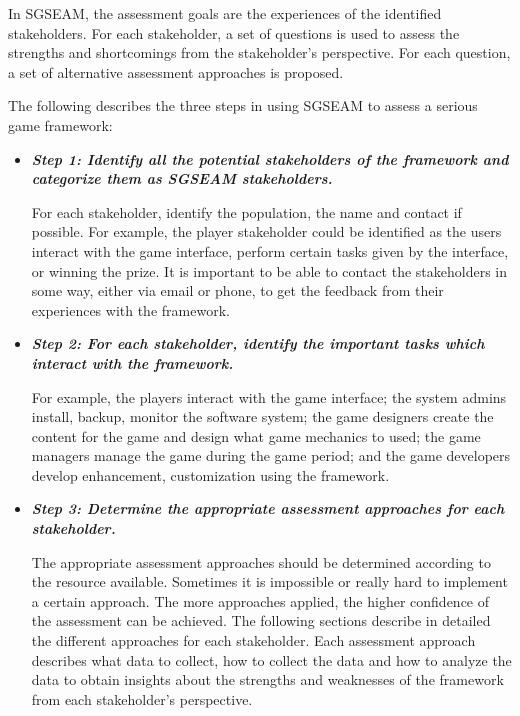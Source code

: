 In SGSEAM, the assessment goals are the experiences of the identified stakeholders. For each
stakeholder, a set of questions is used to assess the strengths and shortcomings from the
stakeholder's perspective. For each question, a set of alternative assessment approaches is
proposed.

The following describes the three steps in using SGSEAM to assess a serious game framework:

\begin{itemize}
\item \textbf{\emph{Step 1: Identify all the potential stakeholders of the framework and categorize them as SGSEAM stakeholders.}}

For each stakeholder, identify the population, the name and contact if possible. For example, the 
player stakeholder could be identified as the users interact with the game interface, perform certain tasks given by the interface, or winning the prize. It is important to be able to contact the stakeholders in some way, either via email or phone, to get the feedback from their experiences with the framework.


\item \textbf{\emph{Step 2: For each stakeholder, identify the important tasks which interact with the framework.}}
    
For example, the players interact with the game interface; the system admins install, backup, monitor the software system; the game designers create the content for the game and design what game mechanics to used; the game managers manage the game during the game period; and the game developers develop enhancement, customization using the framework.

\item \textbf{\emph{Step 3: Determine the appropriate assessment approaches for each stakeholder.}}

The appropriate assessment approaches should be determined according to the resource available. Sometimes it is impossible or really hard to implement a certain approach. The more approaches applied, the higher confidence of the assessment can be achieved. The following sections describe in detailed the different approaches for each stakeholder.  Each assessment approach describes what data to collect, how to collect the data and how to analyze the data to obtain insights about the strengths and weaknesses of the framework from each stakeholder's perspective.

\end{itemize}

